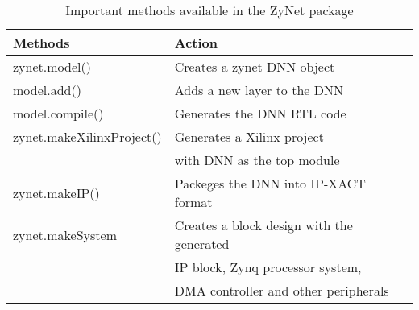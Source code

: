 \begin{table}[!h]
  \centering
  \caption{Important methods available in the ZyNet package} 
  \begin{tabular}{l|l}
      \toprule
      \bf{Methods} & \bf{Action} \\
      \midrule
	zynet.model() & Creates a zynet DNN object \\
	model.add() & Adds a new layer to the DNN \\
	model.compile() & Generates the DNN RTL code\\
	zynet.makeXilinxProject() & Generates a Xilinx project\\ 
				  & with DNN as the top module\\
	zynet.makeIP() & Packeges the DNN into IP-XACT format\\
	zynet.makeSystem & Creates a block design with the generated \\
			 & IP block, Zynq processor system,\\ 
			 & DMA controller and other peripherals\\
      \bottomrule
    \end{tabular}
    \label{table:apis}
\end{table}
